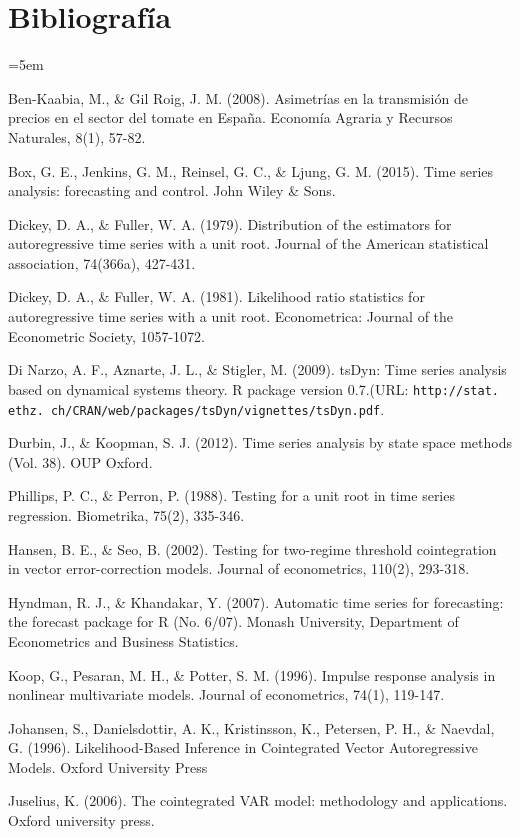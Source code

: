\chapter{Bibliografía}

\hangindent=5em

Ben-Kaabia, M., \& Gil Roig, J. M. (2008). Asimetrías en la transmisión de precios en el sector del tomate en España. Economía Agraria y Recursos Naturales, 8(1), 57-82.

Box, G. E., Jenkins, G. M., Reinsel, G. C., \& Ljung, G. M. (2015). Time series analysis: forecasting and control. John Wiley \& Sons.

Dickey, D. A., \& Fuller, W. A. (1979). Distribution of the estimators for autoregressive time series with a unit root. Journal of the American statistical association, 74(366a), 427-431.

Dickey, D. A., \& Fuller, W. A. (1981). Likelihood ratio statistics for autoregressive time series with a unit root. Econometrica: Journal of the Econometric Society, 1057-1072.

Di Narzo, A. F., Aznarte, J. L., \& Stigler, M. (2009). tsDyn: Time series analysis based on dynamical systems theory. R package version 0.7.(URL: \texttt{http://stat. ethz. ch/CRAN/web/packages/tsDyn/vignettes/tsDyn.pdf}.

Durbin, J., \& Koopman, S. J. (2012). Time series analysis by state space methods (Vol. 38). OUP Oxford.

Phillips, P. C., \& Perron, P. (1988). Testing for a unit root in time series regression. Biometrika, 75(2), 335-346.

Hansen, B. E., \& Seo, B. (2002). Testing for two-regime threshold cointegration in vector error-correction models. Journal of econometrics, 110(2), 293-318.

Hyndman, R. J., \& Khandakar, Y. (2007). Automatic time series for forecasting: the forecast package for R (No. 6/07). Monash University, Department of Econometrics and Business Statistics.

Koop, G., Pesaran, M. H., \& Potter, S. M. (1996). Impulse response analysis in nonlinear multivariate models. Journal of econometrics, 74(1), 119-147.

Johansen, S., Danielsdottir, A. K., Kristinsson, K., Petersen, P. H., \& Naevdal, G. (1996). Likelihood-Based Inference in Cointegrated Vector Autoregressive Models. Oxford University Press

Juselius, K. (2006). The cointegrated VAR model: methodology and applications. Oxford university press.


